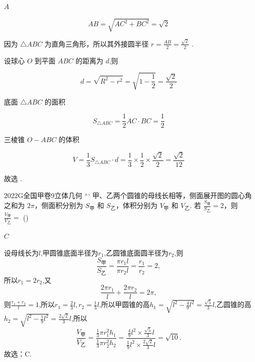\documentclass[12pt,UTF-8,a4paper]{ctexart}
\numberwithin{figure}{section}
\theoremstyle{mystyle}
\theoremstyle{mystylekaishu}
\theoremstyle{mystyle}
\numberwithin{xiti}{section}
\begin{document}
\begin{answer}
$A$
\end{answer}

\begin{solutions}
$$
AB = \sqrt{AC^2 + BC^2} = \sqrt{2}
$$

因为 $\triangle ABC$ 为直角三角形，所以其外接圆半径 $r = \frac{AB}{2} = \frac{\sqrt{2}}{2}$ .

设球心 $O$ 到平面 $ABC$ 的距离为 $d$,则

$$
d = \sqrt{R^2 - r^2} = \sqrt{1 - \frac{1}{2}} = \frac{\sqrt{2}}{2}
$$

底面 $\triangle ABC$ 的面积

$$
S_{\triangle ABC} = \frac{1}{2} AC \cdot BC = \frac{1}{2}
$$

三棱锥 $O-ABC$ 的体积

$$
V = \frac{1}{3} S_{\triangle ABC} \cdot d = \frac{1}{3} \times \frac{1}{2} \times \frac{\sqrt{2}}{2} = \frac{\sqrt{2}}{12}
$$

故选  .
\end{solutions}


\begin{problem}{2022}{G}{全国甲卷}{9}{立体几何}
```
甲、乙两个圆锥的母线长相等，侧面展开图的圆心角之和为 $2 \pi$，侧面积分别为 $S_{\text{甲}}$ 和 $S_{\text{乙}}$，体积分别为 $V_{\text{甲}}$ 和 $V_{\text{乙}}$. 若 $\frac{S_{\text{甲}}}{S_{\text{乙}}}=2$，则 $\frac{V_{\text{甲}}}{V_{\text{乙}}}=$ (\hspace{1cm})
\begin{choices}
\end{choices}
\end{problem}

\begin{answer}
$C$
\end{answer}

\begin{solutions}
设母线长为$l$,甲圆锥底面半径为$r_1$,乙圆锥底面圆半径为$r_2$,则
$$
\frac{S_{\text{甲}}}{S_{\text{乙}}} = \frac{\pi r_1 l}{\pi r_2 l} = \frac{r_1}{r_2} = 2,
$$
所以$r_1 = 2r_2$,又
$$
\frac{2\pi r_1}{l} + \frac{2\pi r_2}{l} = 2\pi,
$$
则$\frac{r_1 + r_2}{l} = 1$,所以$r_1 = \frac{2}{3}l, r_2 = \frac{1}{3}l$,所以甲圆锥的高$h_1 = \sqrt{l^2 - \frac{4}{9}l^2} = \frac{\sqrt{5}}{3}l$,乙圆锥的高$h_2 = \sqrt{l^2 - \frac{1}{9}l^2} = \frac{2\sqrt{2}}{3}l$,所以
$$
\frac{V_{\text{甲}}}{V_{\text{乙}}} = \frac{\frac{1}{3}\pi r_1^2 h_1}{\frac{1}{3}\pi r_2^2 h_2} = \frac{\frac{4}{9}l^2 \times \frac{\sqrt{5}}{3}l}{\frac{1}{9}l^2 \times \frac{2\sqrt{2}}{3}l} = \sqrt{10}.
$$
故选：C.
\end{solutions}
\end{document}
